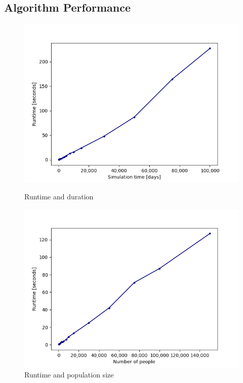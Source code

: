 \documentclass[11pt]{article}
\begin{document}
\subsection{Algorithm Performance}
\begin{figure}[h]
\centering
\begin{minipage}{.5\textwidth}
  \centering
  \includegraphics[width=1\linewidth]{runtimedays}
  \caption{Runtime and duration}  
  \label{fig:10}
  
\end{minipage}%
\begin{minipage}{.5\textwidth}
  \centering
  \includegraphics[width=1\linewidth]{runtimepopulation}
  \caption{Runtime and population size}
  \label{fig:11}
 
\end{minipage}%
\end{figure}
\end{document}
